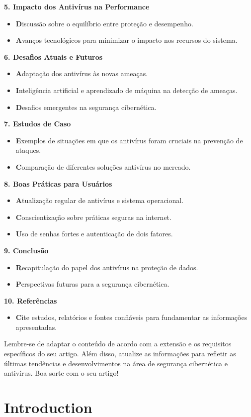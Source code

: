\documentclass[10pt,conference,twocolumn]{article}
\begin{document}
\textbf {5. Impacto dos Antivírus na Performance}
 \begin{itemize}
\item \textbf Discussão sobre o equilíbrio entre proteção e desempenho.
\item \textbf Avanços tecnológicos para minimizar o impacto nos recursos do sistema.
\end{itemize}
\textbf {6. Desafios Atuais e Futuros}
 \begin{itemize}
 
\item \textbf Adaptação dos antivírus às novas ameaças.
\item \textbf Inteligência artificial e aprendizado de máquina na detecção de ameaças.
\item \textbf Desafios emergentes na segurança cibernética.
\end{itemize}

\textbf {7. Estudos de Caso}
 \begin{itemize}
\item \textbf Exemplos de situações em que os antivírus foram cruciais na prevenção de ataques.
\item \textbf Comparação de diferentes soluções antivírus no mercado.
\end{itemize}

\textbf {8. Boas Práticas para Usuários}
 \begin{itemize}
\item \textbf Atualização regular de antivírus e sistema operacional.
\item \textbf Conscientização sobre práticas seguras na internet.
\item \textbf Uso de senhas fortes e autenticação de dois fatores.
\end{itemize}

\textbf {9. Conclusão}
 \begin{itemize}
\item \textbf Recapitulação do papel dos antivírus na proteção de dados.
\item \textbf Perspectivas futuras para a segurança cibernética.
\end{itemize}

\textbf {10. Referências}
 \begin{itemize}
\item \textbf Cite estudos, relatórios e fontes confiáveis para fundamentar as informações apresentadas.
\end{itemize}

Lembre-se de adaptar o conteúdo de acordo com a extensão e os requisitos específicos do seu artigo. Além disso, atualize as informações para refletir as últimas tendências e desenvolvimentos na área de segurança cibernética e antivírus. Boa sorte com o seu artigo!

\section{Introduction}
\end{document}
